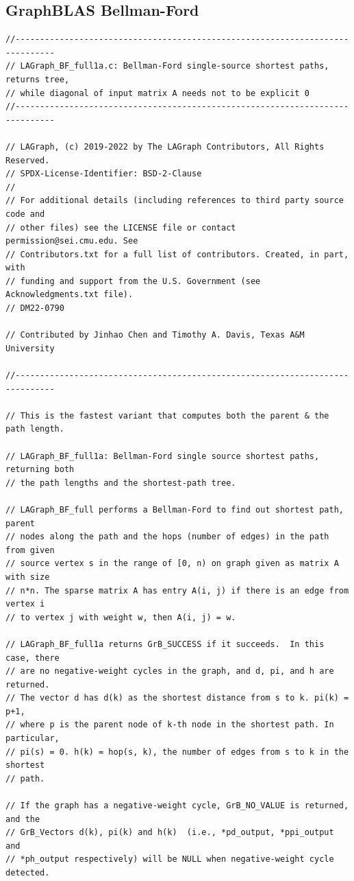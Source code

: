 \subsection{GraphBLAS Bellman-Ford}
\begin{verbatim}
//------------------------------------------------------------------------------
// LAGraph_BF_full1a.c: Bellman-Ford single-source shortest paths, returns tree,
// while diagonal of input matrix A needs not to be explicit 0
//------------------------------------------------------------------------------

// LAGraph, (c) 2019-2022 by The LAGraph Contributors, All Rights Reserved.
// SPDX-License-Identifier: BSD-2-Clause
//
// For additional details (including references to third party source code and
// other files) see the LICENSE file or contact permission@sei.cmu.edu. See
// Contributors.txt for a full list of contributors. Created, in part, with
// funding and support from the U.S. Government (see Acknowledgments.txt file).
// DM22-0790

// Contributed by Jinhao Chen and Timothy A. Davis, Texas A&M University

//------------------------------------------------------------------------------

// This is the fastest variant that computes both the parent & the path length.

// LAGraph_BF_full1a: Bellman-Ford single source shortest paths, returning both
// the path lengths and the shortest-path tree.

// LAGraph_BF_full performs a Bellman-Ford to find out shortest path, parent
// nodes along the path and the hops (number of edges) in the path from given
// source vertex s in the range of [0, n) on graph given as matrix A with size
// n*n. The sparse matrix A has entry A(i, j) if there is an edge from vertex i
// to vertex j with weight w, then A(i, j) = w.

// LAGraph_BF_full1a returns GrB_SUCCESS if it succeeds.  In this case, there
// are no negative-weight cycles in the graph, and d, pi, and h are returned.
// The vector d has d(k) as the shortest distance from s to k. pi(k) = p+1,
// where p is the parent node of k-th node in the shortest path. In particular,
// pi(s) = 0. h(k) = hop(s, k), the number of edges from s to k in the shortest
// path.

// If the graph has a negative-weight cycle, GrB_NO_VALUE is returned, and the
// GrB_Vectors d(k), pi(k) and h(k)  (i.e., *pd_output, *ppi_output and
// *ph_output respectively) will be NULL when negative-weight cycle detected.


\end{verbatim}
